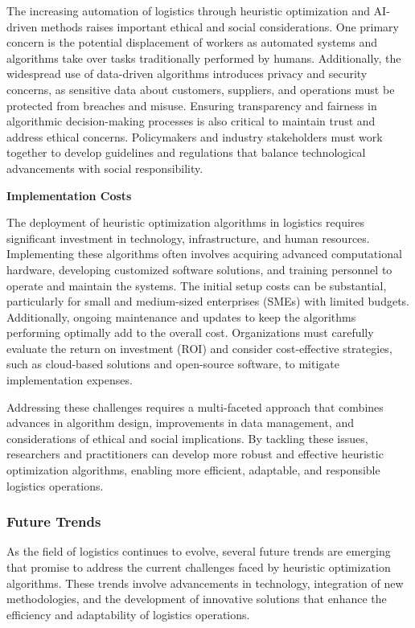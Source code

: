 \documentclass{article}
\begin{document}
    The increasing automation of logistics through heuristic optimization and AI-driven methods raises important ethical and social considerations. One primary concern is the potential displacement of workers as automated systems and algorithms take over tasks traditionally performed by humans. Additionally, the widespread use of data-driven algorithms introduces privacy and security concerns, as sensitive data about customers, suppliers, and operations must be protected from breaches and misuse. Ensuring transparency and fairness in algorithmic decision-making processes is also critical to maintain trust and address ethical concerns. Policymakers and industry stakeholders must work together to develop guidelines and regulations that balance technological advancements with social responsibility.

    \textbf{Implementation Costs}

    The deployment of heuristic optimization algorithms in logistics requires significant investment in technology, infrastructure, and human resources. Implementing these algorithms often involves acquiring advanced computational hardware, developing customized software solutions, and training personnel to operate and maintain the systems. The initial setup costs can be substantial, particularly for small and medium-sized enterprises (SMEs) with limited budgets. Additionally, ongoing maintenance and updates to keep the algorithms performing optimally add to the overall cost. Organizations must carefully evaluate the return on investment (ROI) and consider cost-effective strategies, such as cloud-based solutions and open-source software, to mitigate implementation expenses.

    Addressing these challenges requires a multi-faceted approach that combines advances in algorithm design, improvements in data management, and considerations of ethical and social implications. By tackling these issues, researchers and practitioners can develop more robust and effective heuristic optimization algorithms, enabling more efficient, adaptable, and responsible logistics operations.

    \subsubsection{Future Trends}\label{subsec:future-trends}

    As the field of logistics continues to evolve, several future trends are emerging that promise to address the current challenges faced by heuristic optimization algorithms. These trends involve advancements in technology, integration of new methodologies, and the development of innovative solutions that enhance the efficiency and adaptability of logistics operations.
\end{document}
